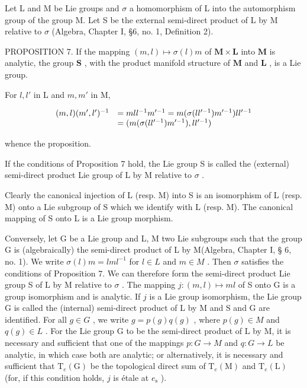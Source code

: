 Let L and M be Lie groups and \(\sigma\) a homomorphism of L into the automorphism group of the group M. Let S be the external semi-direct product of L by M relative to \(\sigma\) (Algebra, Chapter I, §6, no. 1, Definition 2).

PROPOSITION 7. If the mapping \((m, l) \mapsto \sigma(l)m\) of \(\mathbf{M} \times \mathbf{L}\) into \(\mathbf{M}\) is analytic, the group \(\mathbf{S}\) , with the product manifold structure of \(\mathbf{M}\) and \(\mathbf{L}\) , is a Lie group.

For \(l, l'\) in L and \(m, m'\) in M,

\[
\begin{array}{r l} (m, l) (m ^ {\prime}, l ^ {\prime}) ^ {- 1} & = m l l ^ {- 1} m ^ {\prime - 1} = m (\sigma (l l ^ {\prime - 1}) m ^ {\prime - 1}) l l ^ {\prime - 1} \\ & = (m (\sigma (l l ^ {\prime - 1}) m ^ {\prime - 1}), l l ^ {\prime - 1}) \end{array}
\]

whence the proposition.

If the conditions of Proposition 7 hold, the Lie group S is called the (external) semi-direct product Lie group of L by M relative to \(\sigma\) .

Clearly the canonical injection of L (resp. M) into S is an isomorphism of L (resp. M) onto a Lie subgroup of S which we identify with L (resp. M). The canonical mapping of S onto L is a Lie group morphism.

Conversely, let G be a Lie group and L, M two Lie subgroups such that the group G is (algebraically) the semi-direct product of L by M(Algebra, Chapter I, § 6, no. 1). We write \(\sigma(l)m = lml^{-1}\) for \(l \in L\) and \(m \in M\) . Then \(\sigma\) satisfies the conditions of Proposition 7. We can therefore form the semi-direct product Lie group S of L by M relative to \(\sigma\) . The mapping \(j: (m, l) \mapsto ml\) of S onto G is a group isomorphism and is analytic. If \(j\) is a Lie group isomorphism, the Lie group G is called the (internal) semi-direct product of L by M and S and G are identified. For all \(g \in G\) , we write \(g = p(g)q(g)\) , where \(p(g) \in M\) and \(q(g) \in L\) . For the Lie group G to be the semi-direct product of L by M, it is necessary and sufficient that one of the mappings \(p: G \to M\) and \(q: G \to L\) be analytic, in which case both are analytic; or alternatively, it is necessary and sufficient that \(\mathrm{T}_{e}(\mathrm{G})\) be the topological direct sum of \(\mathrm{T}_{e}(\mathrm{M})\) and \(\mathrm{T}_{e}(\mathrm{L})\) (for, if this condition holds, \(j\) is étale at \(e_{\mathrm{s}}\) ).

